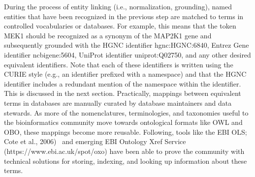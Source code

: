 During the process of entity linking (i.e., normalization, grounding), named entities that have been recognized in the previous step are matched to terms in controlled vocabularies or databases.
For example, this means that the token MEK1 should be recognized as a synonym of the MAP2K1 gene and subsequently grounded with the HGNC identifier hgnc:HGNC:6840, Entrez Gene identifier ncbigene:5604, UniProt identifier uniprot:Q02750, and any other desired equivalent identifiers.
Note that each of these identifiers is written using the \ac{CURIE} style (e.g., an identifier prefixed with a namespace) and that the HGNC identifier includes a redundant mention of the namespace within the identifier.
This is discussed in the next section.
Practically, mappings between equivalent terms in databases are manually curated by database maintainers and data stewards.
As more of the nomenclatures, terminologies, and taxonomies useful to the bioinformatics community move towards ontological formats like OWL and OBO, these mappings become more reusable.
Following, tools like the \ac{EBI} \ac{OLS}; Cote et al., 2006)~\cite{Cote2006} and emerging \ac{EBI}  Ontology Xref Service (https://www.ebi.ac.uk/spot/oxo) have been able to prove the community with technical solutions for storing, indexing, and looking up information about these terms.
